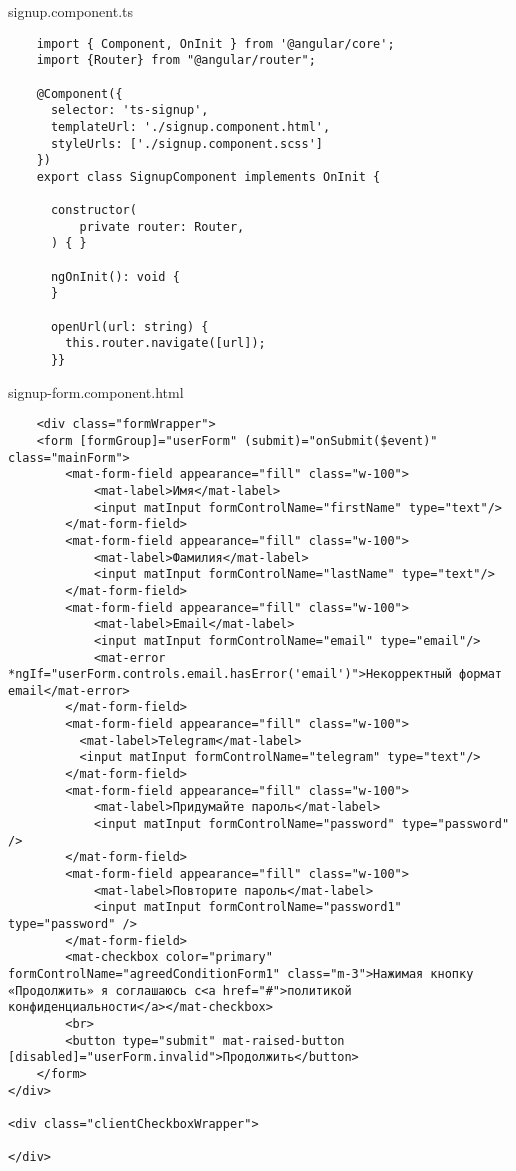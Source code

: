 signup.component.ts
\lstset{style=ts}
\begin{lstlisting}
    import { Component, OnInit } from '@angular/core';
    import {Router} from "@angular/router";
    
    @Component({
      selector: 'ts-signup',
      templateUrl: './signup.component.html',
      styleUrls: ['./signup.component.scss']
    })
    export class SignupComponent implements OnInit {
    
      constructor(
          private router: Router,
      ) { }
    
      ngOnInit(): void {
      }
    
      openUrl(url: string) {
        this.router.navigate([url]);
      }}
\end{lstlisting}

signup-form.component.html
\begin{lstlisting}
    <div class="formWrapper">
    <form [formGroup]="userForm" (submit)="onSubmit($event)" class="mainForm">
        <mat-form-field appearance="fill" class="w-100">
            <mat-label>Имя</mat-label>
            <input matInput formControlName="firstName" type="text"/>
        </mat-form-field>
        <mat-form-field appearance="fill" class="w-100">
            <mat-label>Фамилия</mat-label>
            <input matInput formControlName="lastName" type="text"/>
        </mat-form-field>
        <mat-form-field appearance="fill" class="w-100">
            <mat-label>Email</mat-label>
            <input matInput formControlName="email" type="email"/>
            <mat-error *ngIf="userForm.controls.email.hasError('email')">Некорректный формат email</mat-error>
        </mat-form-field>
        <mat-form-field appearance="fill" class="w-100">
          <mat-label>Telegram</mat-label>
          <input matInput formControlName="telegram" type="text"/>
        </mat-form-field>
        <mat-form-field appearance="fill" class="w-100">
            <mat-label>Придумайте пароль</mat-label>
            <input matInput formControlName="password" type="password" />
        </mat-form-field>
        <mat-form-field appearance="fill" class="w-100">
            <mat-label>Повторите пароль</mat-label>
            <input matInput formControlName="password1" type="password" />
        </mat-form-field>
        <mat-checkbox color="primary" formControlName="agreedConditionForm1" class="m-3">Нажимая кнопку «Продолжить» я соглашаюсь с<a href="#">политикой конфиденциальности</a></mat-checkbox>
        <br>
        <button type="submit" mat-raised-button [disabled]="userForm.invalid">Продолжить</button>
    </form>
</div>

<div class="clientCheckboxWrapper">

</div>
\end{lstlisting}


